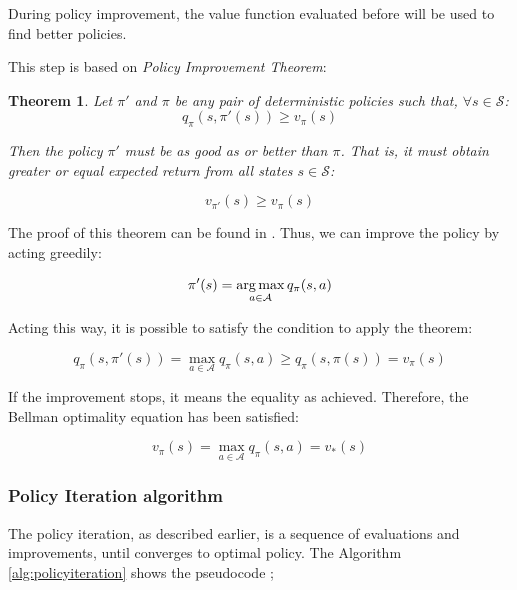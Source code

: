 During policy improvement, the value function evaluated before will be used to find better policies.

This step is based on \textit{Policy Improvement Theorem}:

\newtheorem{policyimprovement}{Theorem}

\begin{policyimprovement}
	Let $\pi'$ and $\pi$ be any pair of deterministic policies such that, $\forall s \in \mathcal{S}$:
	\begin{equation}
	q_{\pi}(s, \pi'(s)) \geq v_{\pi}(s)
	\end{equation}
	
	Then the policy $\pi'$ must be as good as or better than $\pi$. That is, it must obtain greater or equal expected return from all states $s \in \mathcal{S}$:
	
	\begin{equation}
	v_{\pi'}(s) \geq v_{\pi}(s)
	\end{equation}
\end{policyimprovement}

The proof of this theorem can be found in \cite{sutton1998rli}. Thus, we can improve the policy by acting greedily:

\begin{equation}
\pi'(s) = \operatorname*{arg\,max}_{a \in \mathcal{A}} q_{\pi}(s,a)
\end{equation}

Acting this way, it is possible to satisfy the condition to apply the theorem:

\begin{equation}
q_{\pi}(s,\pi'(s)) = \max_{a \in \mathcal{A}}q_{\pi}(s,a) \geq q_{\pi}(s, \pi(s)) = v_{\pi}(s)
\end{equation}

If the improvement stops, it means the equality as achieved. Therefore, the Bellman optimality equation has been satisfied:

\begin{equation}
v_{\pi}(s) = \max_{a \in \mathcal{A}} q_{\pi}(s, a) = v_{*}(s)
\end{equation}

\subsubsection{Policy Iteration algorithm}

The policy iteration, as described earlier, is a sequence of evaluations and improvements, until converges to optimal policy. The Algorithm \ref{alg:policyiteration} shows the pseudocode \cite{sutton1998rli};

